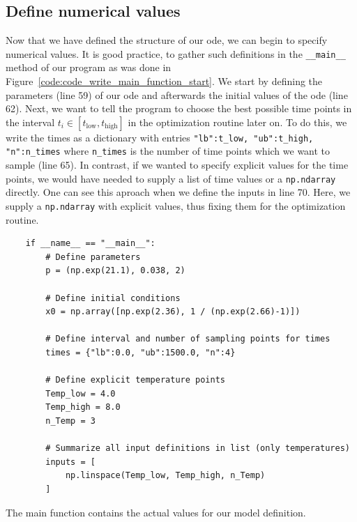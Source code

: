 \documentclass[10pt,A4paper]{article}
\begin{document}
\subsection*{Define numerical values}
Now that we have defined the structure of our \ac{ode}, we can begin to specify numerical values.
It is good practice, to gather such definitions in the \texttt{__main__} method of our program as was done in Figure~\ref{code:code_write_main_function_start}.
We start by defining the parameters (line 59) of our \ac{ode} and afterwards the initial values of the \ac{ode} (line 62).
Next, we want to tell the program to choose the best possible time points in the interval $t_i\in\left[t_\text{low},t_\text{high}\right]$ in the optimization routine later on.
To do this, we write the times as a dictionary with entries \texttt{{"lb":t_low, "ub":t_high, "n":n_times}} where \texttt{n_times} is the number of time points which we want to sample (line 65).
In contrast, if we wanted to specify explicit values for the time points, we would have needed to supply a list of time values or a \texttt{np.ndarray} directly.
One can see this aproach when we define the inputs in line 70.
Here, we supply a \texttt{np.ndarray} with explicit values, thus fixing them for the optimization routine.
\begin{code}[h]
    \begin{verbatim}
    if __name__ == "__main__":
        # Define parameters
        p = (np.exp(21.1), 0.038, 2)

        # Define initial conditions
        x0 = np.array([np.exp(2.36), 1 / (np.exp(2.66)-1)])

        # Define interval and number of sampling points for times
        times = {"lb":0.0, "ub":1500.0, "n":4}

        # Define explicit temperature points
        Temp_low = 4.0
        Temp_high = 8.0
        n_Temp = 3

        # Summarize all input definitions in list (only temperatures)
        inputs = [
            np.linspace(Temp_low, Temp_high, n_Temp)
        ]
    \end{verbatim}
    \caption{The main function contains the actual values for our model definition.}
    \label{code:code_write_main_function_start}
\end{code}
\end{document}
